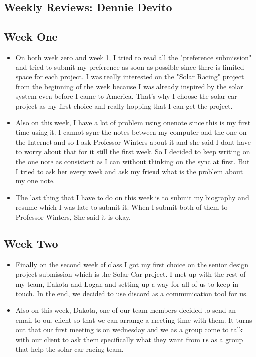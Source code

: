 \begin{singlespace}
\section{Weekly Reviews: Dennie Devito}
\subsection{Week One}
\begin{itemize}
    \item On both week zero and week 1, I tried to read all the "preference submission" and tried to submit my preference as soon as possible since there is limited space for each project. I was really interested on the "Solar Racing" project from the beginning of the week because I was already inspired by the solar system even before I came to America. That's why I choose the solar car project as my first choice and really hopping that I can get the project. 
    \item Also on this week, I have a lot of problem using onenote since this is my first time using it. I cannot sync the notes between my computer and the one on the Internet and so I ask Professor Winters about it and she said I dont have to worry about that for it still the first week. So I decided to keep writing on the one note as consistent as I can without thinking on the sync at first. But I tried to ask her every week and ask my friend what is the problem about my one note. 
    \item The last thing that I have to do on this week is to submit my biography and resume which I was late to submit it. When I submit both of them to Professor Winters, She said it is okay. 
\end{itemize}

\subsection{Week Two}
\begin{itemize}
    \item Finally on the second week of class I got my first choice on the senior design project submission which is the Solar Car project. I met up with the rest of my team, Dakota and Logan and setting up a way for all of us to keep in touch. In the end, we decided to use discord as a communication tool for us. 
    \item Also on this week, Dakota, one of our team members decided to send an email to our client so that we can arrange a meeting time with them. It turns out that our first meeting is on wednesday and we as a group come to talk with our client to ask them specifically what they want from us as a group that help the solar car racing team. 
\end{itemize}


\end{singlespace}
